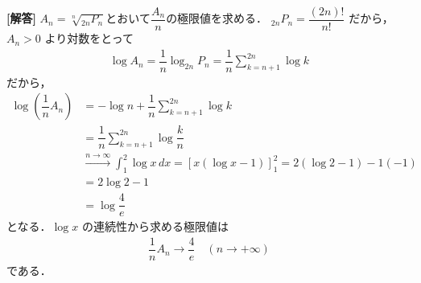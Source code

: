 \documentclass[../../main.tex]{subfiles}
\begin{document}
\begin{oframed}
  
\end{oframed}

{\bf [解答]}
$A_n = \sqrt[n]{_{2n}P_n}$とおいて$\dfrac{A_n}{n}$の極限値を求める．
$_{2n}P_n = \dfrac{(2n)!}{n!}$ だから，$A_n > 0$ より対数をとって
\begin{align}
  \log A_n = \dfrac{1}{n} \log _{2n}P_n = \dfrac{1}{n} \sum_{k=n+1}^{2n} \log k
\end{align}
だから，
\begin{align}
  \log \left(\dfrac{1}{n} A_n\right)
  &= -\log n + \dfrac{1}{n} \sum_{k=n+1}^{2n} \log k \\
  &= \dfrac{1}{n} \sum_{k=n+1}^{2n} \log \dfrac{k}{n} \\
  &\xrightarrow{n \to \infty} \int_{1}^{2} \log x \, dx = [x(\log x - 1)]_1^2 = 2(\log 2 - 1) - 1(-1) \\
  &= 2 \log 2 - 1 \\
  &= \log \dfrac{4}{e}
\end{align}
となる．$\log x$ の連続性から求める極限値は
\begin{align}
  \dfrac{1}{n} A_n \longrightarrow \dfrac{4}{e} \quad (n \to +\infty)
\end{align}
である．
\end{document}
